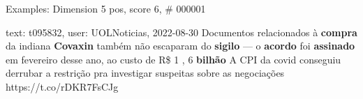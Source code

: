 \begin{frame}{Examples: Dimension 5 pos, score 6, \# 000001}
\footnotesize
\begin{exampleblock}{text: t095832, user: UOLNoticias, 2022-08-30}
Documentos relacionados à \textbf{compra} da indiana \textbf{Covaxin} também 
não escaparam do \textbf{sigilo} — o \textbf{acordo} foi \textbf{assinado} em 
fevereiro desse ano, ao custo de R\$ 1 , 6 \textbf{bilhão} 
 A CPI da covid conseguiu 
derrubar a restrição pra investigar suspeitas sobre as negociações 
https://t.co/rDKR7FsCJg 
\end{exampleblock}
\end{frame}
